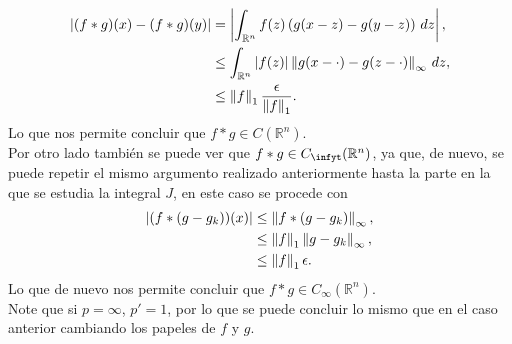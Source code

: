 \begin{homeworkProblem}
\begin{solution}
\begin{enumerate}[(i)]
        \begin{align*}
          |(f*g)(x)-(f*g)(y)|&=\left| \int_{\mathbb{R}^{n}}f(z)\left( g(x-z)-g(y-z) \right)\, dz \right|,\\
          &\leq \int_{\mathbb{R}^{n}}|f(z)|\left\|g(x-\cdot)-g(z-\cdot)\right\|_{\infty}\, dz,\\
          &\leq \left\|f\right\|_{1}\frac{\epsilon}{\left\|f\right\|_{1}}.
        \end{align*}
        Lo que nos permite concluir que $f*g\in C(\mathbb{R}^{n})$.\\
        Por otro lado también se puede ver que $f*g\in C_{\infyt}(\mathbb{R}^{n})$, ya que, de nuevo, se puede repetir el mismo argumento realizado anteriormente hasta la parte en la que se estudia la integral $J$, en este caso se procede con
        \begin{align*}
          |(f*(g-g_k))(x)|&\leq\left\|f*(g-g_{k})\right\|_{\infty},\\
          &\leq \left\|f\right\|_{1}\left\|g-g_{k}\right\|_{\infty},\\
          &\leq \left\|f\right\|_{1}\epsilon.
        \end{align*}
        Lo que de nuevo nos permite concluir que $f*g\in C_{\infty}(\mathbb{R}^{n})$.\\
        Note que si $p=\infty$, $p'=1$, por lo que se puede concluir lo mismo que en el caso anterior cambiando los papeles de $f$ y $g$. 
    \end{enumerate}   
  \end{solution}
\end{homeworkProblem}
